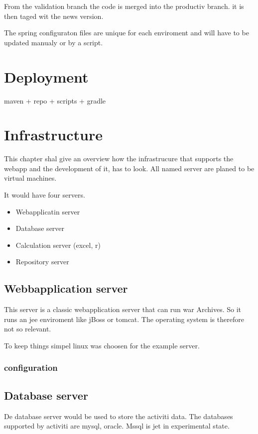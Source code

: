 \documentclass[paper=a4,twoside=false,BCOR=0mm,DIV=calc,fontsize=12pt]{scrartcl}
\begin{document}

From the validation branch the code is merged into the productiv branch. it is then taged wit the news version.

The spring configuraton files are unique for each enviroment and will have to be updated manualy or by a script.


\section{Deployment}

maven + repo + scripts + gradle


\section{Infrastructure}
This chapter shal give an overview how the infrastrucure that supports the webapp and the development of it, has to look. 
All named server are planed to be virtual machines.

It would have four servers. 
\begin{itemize}
 \item Webapplicatin server
 \item Database server
 \item Calculation server (excel, r)
 \item Repository server
\end{itemize}

\subsection{Webbapplication server}
This server is a classic webapplication server that can run war Archives. 
So it runs an jee enviroment like jBoss or tomcat.
The operating system is therefore not so relevant. 

To keep things simpel linux was choosen for the example server.

\subsubsection{configuration}


\subsection{Database server}
De database server would be used to store the activiti data. The databases supported by activiti are mysql, oracle. Mssql is jet in experimental state.
 
\end{document}
